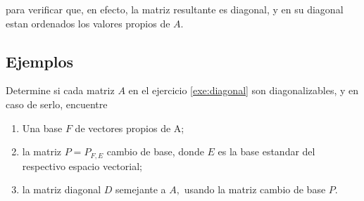\begin{solucion}
para verificar que, en efecto, la matriz resultante es diagonal, y en su diagonal estan ordenados los valores propios
de $A.$
\end{solucion}

\subsection*{Ejemplos}

\begin{resuelto}
 Determine si cada matriz $A$ en el ejercicio  \ref{exe:diagonal} son diagonalizables, y en caso de serlo, encuentre
 \begin{enumerate}
  \item Una base $F$ de vectores propios de A;
  \item la matriz $P=P_{F,E}$ cambio de base, donde  $E$ es la base estandar del respectivo espacio vectorial;
  \item la matriz diagonal $D$ semejante a $A,$ usando la matriz cambio de base $P.$
 \end{enumerate}

\end{resuelto}


